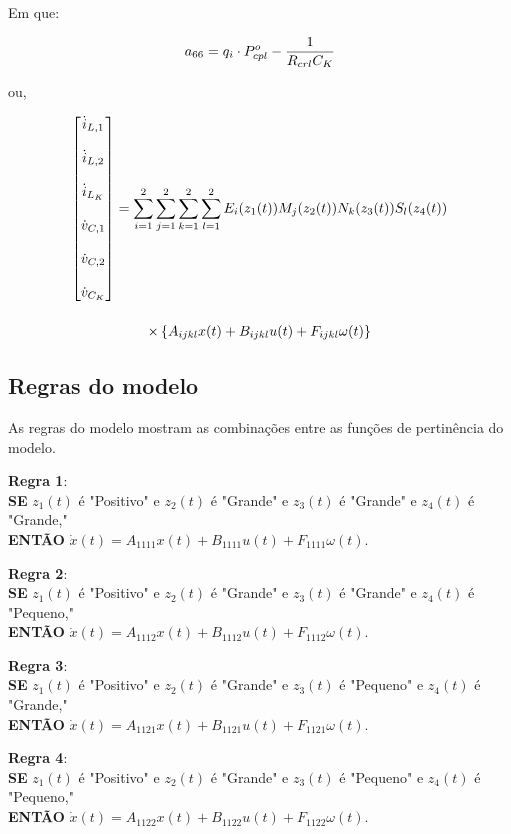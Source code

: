 Em que:

\begin{equation*}
    a_{66} = \displaystyle q_i \cdot P_{cpl}^o - \frac{1}{R_{crl} C_K}
\end{equation*} 

ou, 

\begin{gather}
    \begin{bmatrix}
    \dot{i}_{L,1} \\[12pt] \dot{i}_{L,2} \\[12pt] \dot{i}_{L_K} \\[12pt]
    \dot{v}_{C,1} \\[12pt] \dot{v}_{C,2} \\[12pt] \dot{v}_{C_K}
  \end{bmatrix} =
  \sum\limits_{i=1}^{2} \sum\limits_{j=1}^{2} \sum\limits_{k=1}^{2} \sum\limits_{l=1}^{2} E_i(z_1(t))M_j(z_2(t))N_k(z_3(t))S_l(z_4(t))
  \notag \\[12pt] \times
  \left\{
    A_{ijkl}x(t) + B_{ijkl}u(t) + F_{ijkl}\omega(t)
  \right\}
\end{gather}

\subsection*{Regras do modelo}

As regras do modelo mostram as combinações entre as funções de pertinência do modelo.

\vspace{0.5cm}
\textbf{Regra 1}: \\
\textbf{SE} $z_1(t)$ é "Positivo" e $z_2(t)$ é "Grande" e $z_3(t)$ é "Grande" e $z_4(t)$ é "Grande," \\
\textbf{ENTÃO} $\dot{x}(t) = A_{1111} x(t) + B_{1111} u(t) + F_{1111} \omega(t).$

\vspace{0.5cm}
\textbf{Regra 2}: \\
\textbf{SE} $z_1(t)$ é "Positivo" e $z_2(t)$ é "Grande" e $z_3(t)$ é "Grande" e $z_4(t)$ é "Pequeno," \\
\textbf{ENTÃO} $\dot{x}(t) = A_{1112} x(t) + B_{1112} u(t) + F_{1112} \omega(t).$

\vspace{0.5cm}
\textbf{Regra 3}: \\
\textbf{SE} $z_1(t)$ é "Positivo" e $z_2(t)$ é "Grande" e $z_3(t)$ é "Pequeno" e $z_4(t)$ é "Grande," \\
\textbf{ENTÃO} $\dot{x}(t) = A_{1121} x(t) + B_{1121} u(t) + F_{1121} \omega(t).$

\vspace{0.5cm}
\textbf{Regra 4}: \\
\textbf{SE} $z_1(t)$ é "Positivo" e $z_2(t)$ é "Grande" e $z_3(t)$ é "Pequeno" e $z_4(t)$ é "Pequeno," \\
\textbf{ENTÃO} $\dot{x}(t) = A_{1122} x(t) + B_{1122} u(t) + F_{1122} \omega(t).$